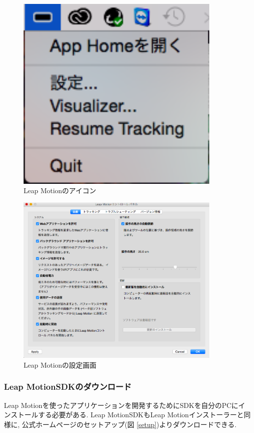 \documentclass{funthesis}
\begin{document}
\begin{figure}[H]
 \begin{center}
  \includegraphics[width=100mm]{./img/setting.png}
 \end{center}
 \caption{Leap Motionのアイコン}
 \label{setting}
\end{figure}

\begin{figure}[H]
 \begin{center}
  \includegraphics[width=100mm]{./img/Lset.png}
 \end{center}
 \caption{Leap Motionの設定画面}
 \label{Lset}
\end{figure}

\subsubsection{Leap MotionSDKのダウンロード}
Leap Motionを使ったアプリケーションを開発するためにSDKを自分のPCにインストールする必要がある. Leap MotionSDKもLeap Motionインストーラーと同様に, 公式ホームページのセットアップ(図 \ref{setup})よりダウンロードできる. 

\listoffigures

\listoftables
\end{document}
